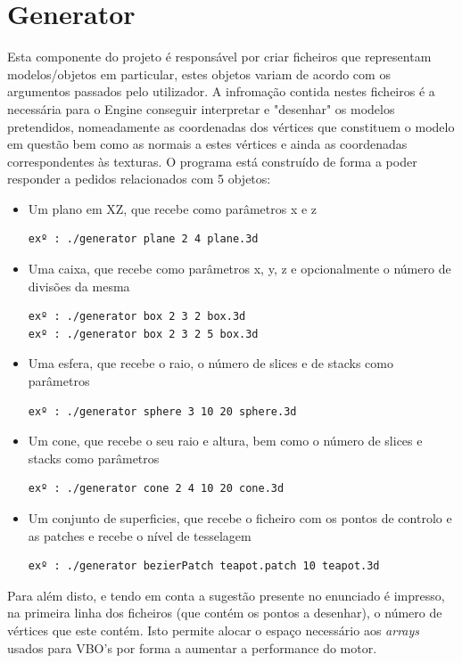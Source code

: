 \documentclass{article}
\begin{document}
\section{Generator}
Esta componente do projeto é responsável por criar ficheiros que representam modelos/objetos em particular, estes objetos variam de acordo com os argumentos passados pelo utilizador. A infromação contida nestes ficheiros é a necessária para o Engine conseguir interpretar e "desenhar" os modelos pretendidos, nomeadamente as coordenadas dos vértices que constituem o modelo em questão bem como as normais a estes vértices e ainda as coordenadas correspondentes às texturas. 
O programa está construído de forma a poder responder a pedidos relacionados com 5 objetos:
\begin{itemize}
    \item Um plano em XZ, que recebe como parâmetros x e z
        \begin{verbatim}
exº : ./generator plane 2 4 plane.3d
        \end{verbatim}
    \item Uma caixa, que recebe como parâmetros x, y, z e opcionalmente o número de divisões da mesma
        \begin{verbatim}
exº : ./generator box 2 3 2 box.3d
exº : ./generator box 2 3 2 5 box.3d
        \end{verbatim}
    \item Uma esfera, que recebe o raio, o número de slices e de stacks como parâmetros
        \begin{verbatim}
exº : ./generator sphere 3 10 20 sphere.3d
        \end{verbatim}
    \item Um cone, que recebe o seu raio e altura, bem como o número de slices e stacks como parâmetros
        \begin{verbatim}
exº : ./generator cone 2 4 10 20 cone.3d
        \end{verbatim}
    \item Um conjunto de superficies, que recebe o ficheiro com os pontos de controlo e as patches e recebe o nível de tesselagem
        \begin{verbatim}
exº : ./generator bezierPatch teapot.patch 10 teapot.3d
        \end{verbatim}
\end{itemize}
Para além disto, e tendo em conta a sugestão presente no enunciado é impresso, na primeira linha dos ficheiros (que contém os pontos a desenhar), o número de vértices que este contém. Isto permite alocar o espaço necessário aos \textit{arrays} usados para VBO's por forma a aumentar a performance do motor.
\end{document}
